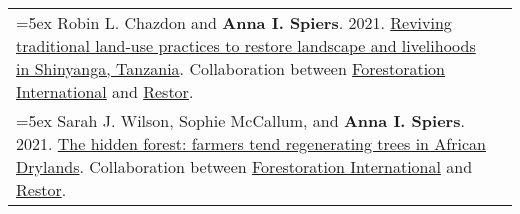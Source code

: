 \begin{longtable}{@{} >{\raggedright}p{6.10in} >{\raggedleft}X @{}}

\hangindent=5ex Robin L. Chazdon and \textbf{Anna I. Spiers}. 2021. \href{https://crowtherlab.com/wp-content/uploads/2021/12/Restor_Case_Study_12_Shinyanga_02_EDITED.pdf}{Reviving traditional land-use practices to restore landscape and livelihoods in Shinyanga, Tanzania}. Collaboration between \href{https://crowtherlab.com/wp-content/uploads/2021/12/Restor_Case_Study_4_Niger_Int.pdf}{Forestoration International} and \href{https://restor.eco/}{Restor}.  &  \tabularnewline

\hangindent=5ex Sarah J. Wilson, Sophie McCallum, and \textbf{Anna I. Spiers}. 2021. \href{https://crowtherlab.com/wp-content/uploads/2021/12/Restor_Case_Study_4_Niger_Int.pdf}{The hidden forest: farmers tend regenerating trees in African Drylands}. Collaboration between \href{https://crowtherlab.com/wp-content/uploads/2021/12/Restor_Case_Study_4_Niger_Int.pdf}{Forestoration International} and \href{https://restor.eco/}{Restor}. &  \tabularnewline

\end{longtable}
